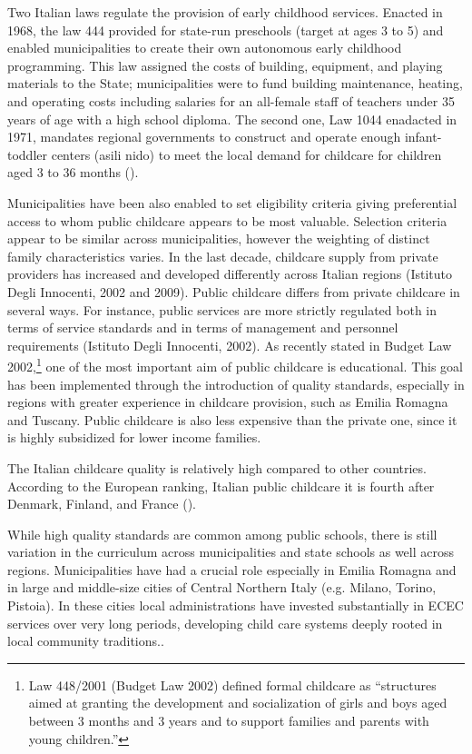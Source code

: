 \documentclass[12pt]{article}
\begin{document}
Two Italian laws regulate the provision of early childhood services. Enacted in 1968, the law 444 provided for state-run preschools (target at ages 3 to 5) and enabled municipalities to create their own autonomous early childhood programming. This law assigned the costs of building, equipment, and playing materials to the State; municipalities were to fund building maintenance, heating, and operating costs including salaries for an all-female staff of teachers under 35 years of age with a high school diploma. The second one, Law 1044 enadacted in 1971, mandates regional governments to construct and operate enough infant-toddler centers (asili nido) to meet the local demand for childcare for children aged 3 to 36 months (\cite{Brilli2016}).

Municipalities have been also enabled to set eligibility criteria giving preferential access to whom public childcare appears to be most valuable. Selection criteria appear to be similar across municipalities, however the weighting of distinct family characteristics varies. In the last decade, childcare supply from private providers has increased and developed differently across Italian regions (Istituto Degli Innocenti, 2002 and 2009). Public childcare differs from private childcare in several ways. For instance, public services are more strictly regulated both in terms of service standards and in terms of management and personnel requirements (Istituto Degli Innocenti, 2002). As recently stated in Budget Law 2002,\footnote{Law 448/2001 (Budget Law 2002) defined formal childcare as ``structures aimed at granting the development and socialization of girls and boys aged between 3 months and 3 years and to support families and parents with young children.''} one of the most important aim of public childcare is educational. This goal has been implemented through the introduction of quality standards, especially in regions with greater experience in childcare provision, such as Emilia Romagna and Tuscany. Public childcare is also less expensive than the private one, since it is highly subsidized for lower income families.

The Italian childcare quality is relatively high compared to other countries. According to the European ranking, Italian public childcare it is fourth after Denmark, Finland, and France (\cite{DeHenau2008}).

While high quality standards are common among public schools, there is still variation in the curriculum across municipalities and state schools as well across regions. Municipalities have had a crucial role especially in Emilia Romagna and in large and middle-size cities of Central Northern Italy (e.g. Milano, Torino, Pistoia). In these cities local administrations have invested substantially in ECEC services over very long periods, developing child care systems deeply rooted in local community traditions..
\end{document}
